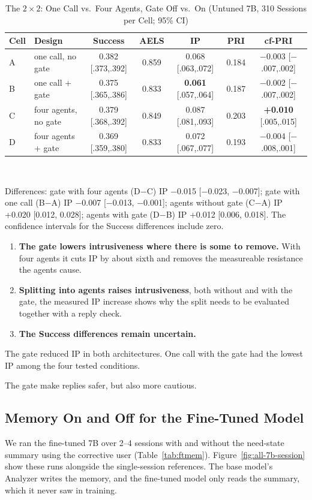 \documentclass[journal]{IEEEtran}
\newcommand{\tsize}{\footnotesize}
\begin{document}
\begin{table}[!t]
\caption{The $2\times2$: One Call vs.\ Four Agents, Gate Off vs.\ On (Untuned 7B, 310 Sessions per Cell; 95\% CI)}
\label{tab:2x2}
\centering\tsize
\begin{tabular}{@{}llccccc@{}}
\toprule
Cell & Design & Success & AELS & IP & PRI & cf-PRI\\
\midrule
A & one call, no gate & 0.382 [.373,.392] & 0.859 & 0.068 [.063,.072] & 0.184 & $-$0.003 [$-$.007,.002]\\
B & one call + gate & 0.375 [.365,.386] & 0.833 & \textbf{0.061} [.057,.064] & 0.187 & $-$0.002 [$-$.007,.002]\\
C & four agents, no gate & 0.379 [.368,.392] & 0.849 & 0.087 [.081,.093] & 0.203 & \textbf{+0.010} [.005,.015]\\
D & four agents + gate & 0.369 [.359,.380] & 0.833 & 0.072 [.067,.077] & 0.193 & $-$0.004 [$-$.008,.001]\\
\bottomrule
\end{tabular}\\[3pt]
\parbox{\textwidth}{\scriptsize Differences: gate with four agents (D$-$C) IP $-$0.015 [$-$0.023, $-$0.007]; gate with one call (B$-$A) IP $-$0.007 [$-$0.013, $-$0.001]; agents without gate (C$-$A) IP +0.020 [0.012, 0.028]; agents with gate (D$-$B) IP +0.012 [0.006, 0.018]. The confidence intervals for the Success differences include zero.}
\end{table}

\begin{enumerate}
\item \textbf{The gate lowers intrusiveness where there is some to remove.} With four agents it cuts IP by about sixth and removes the measureable resistance the agents cause.
\item \textbf{Splitting into agents raises intrusiveness}, both without and with the gate, the measured IP increase shows why the split needs to be evaluated together with a reply check.
\item \textbf{The Success differences remain uncertain.}
\end{enumerate}
The gate reduced IP in both architectures. One call with the gate had the lowest IP among the four tested conditions.

The gate make replies safer, but also more cautious.

\subsection{Memory On and Off for the Fine-Tuned Model}\label{sec:a-mem}
We ran the fine-tuned 7B over 2--4 sessions with and without the need-state summary using the corrective user (Table~\ref{tab:ftmem}). Figure~\ref{fig:all-7b-session} show these runs alongside the single-session references. The base model's Analyzer writes the memory, and the fine-tuned model only reads the summary, which it never saw in training.
\end{document}
